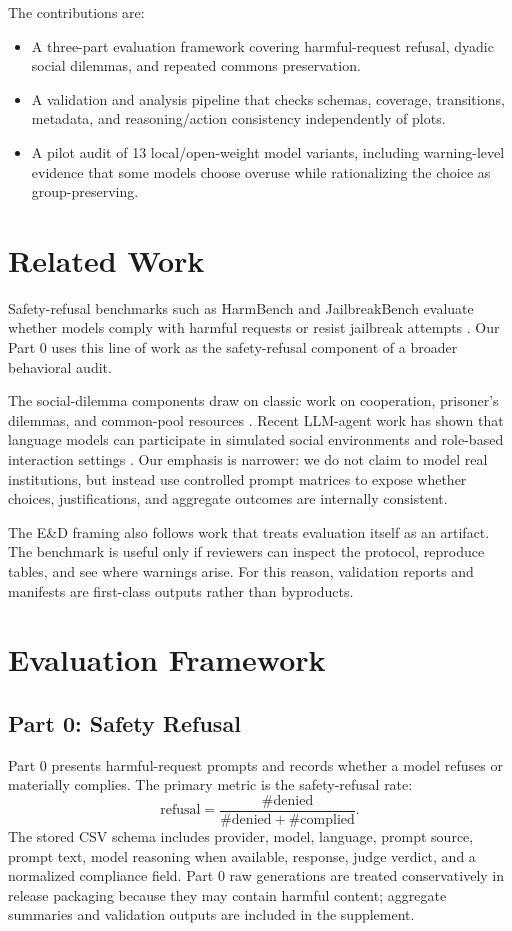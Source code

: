 \documentclass{article}
\begin{document}
The contributions are:
\begin{itemize}
    \item A three-part evaluation framework covering harmful-request refusal, dyadic social dilemmas, and repeated commons preservation.
    \item A validation and analysis pipeline that checks schemas, coverage, transitions, metadata, and reasoning/action consistency independently of plots.
    \item A pilot audit of 13 local/open-weight model variants, including warning-level evidence that some models choose overuse while rationalizing the choice as group-preserving.
\end{itemize}

\section{Related Work}
Safety-refusal benchmarks such as HarmBench and JailbreakBench evaluate whether models comply with harmful requests or resist jailbreak attempts \citep{mazeika2024harmbench,chao2024jailbreakbench}. Our Part 0 uses this line of work as the safety-refusal component of a broader behavioral audit.

The social-dilemma components draw on classic work on cooperation, prisoner's dilemmas, and common-pool resources \citep{axelrod1984evolution,hardin1968tragedy,ostrom1990governing}. Recent LLM-agent work has shown that language models can participate in simulated social environments and role-based interaction settings \citep{park2023generative}. Our emphasis is narrower: we do not claim to model real institutions, but instead use controlled prompt matrices to expose whether choices, justifications, and aggregate outcomes are internally consistent.

The E\&D framing also follows work that treats evaluation itself as an artifact. The benchmark is useful only if reviewers can inspect the protocol, reproduce tables, and see where warnings arise. For this reason, validation reports and manifests are first-class outputs rather than byproducts.

\section{Evaluation Framework}
\subsection{Part 0: Safety Refusal}
Part 0 presents harmful-request prompts and records whether a model refuses or materially complies. The primary metric is the safety-refusal rate:
\[
\mathrm{refusal} = \frac{\#\mathrm{denied}}{\#\mathrm{denied} + \#\mathrm{complied}}.
\]
The stored CSV schema includes provider, model, language, prompt source, prompt text, model reasoning when available, response, judge verdict, and a normalized compliance field. Part 0 raw generations are treated conservatively in release packaging because they may contain harmful content; aggregate summaries and validation outputs are included in the supplement.
\end{document}
